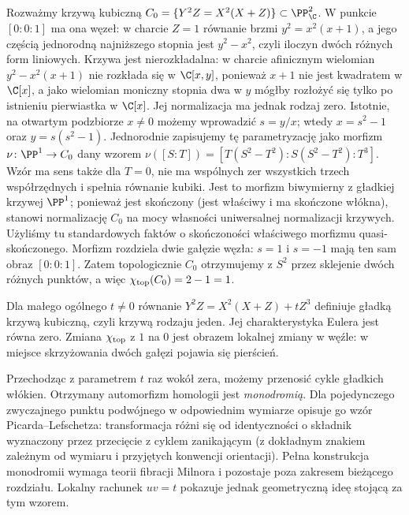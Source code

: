 \begin{przyklad}
Rozważmy krzywą kubiczną
$C_0=\{Y^2Z=X^2(X+Z)\}\subset\PP^2_\C$.
W punkcie $[0:0:1]$ ma ona węzeł: w charcie $Z=1$
równanie brzmi $y^2=x^2(x+1)$, a jego częścią
jednorodną najniższego stopnia jest $y^2-x^2$,
czyli iloczyn dwóch różnych form liniowych.
Krzywa jest nierozkładalna: w charcie afinicznym wielomian
$y^2-x^2(x+1)$ nie rozkłada się w $\C[x,y]$, ponieważ
$x+1$ nie jest kwadratem w $\C[x]$, a jako wielomian
moniczny stopnia dwa w $y$ mógłby rozłożyć się tylko
po istnieniu pierwiastka w $\C[x]$.
Jej normalizacja ma jednak rodzaj zero. Istotnie, na otwartym podzbiorze
$x\ne0$ możemy wprowadzić $s=y/x$; wtedy
$x=s^2-1$ oraz $y=s(s^2-1)$.
Jednorodnie zapisujemy tę parametryzację jako morfizm
$\nu\colon\PP^1\to C_0$ dany wzorem
$\nu([S:T])=[T(S^2-T^2):S(S^2-T^2):T^3]$.
Wzór ma sens także dla $T=0$, nie ma wspólnych zer wszystkich
trzech współrzędnych i spełnia równanie kubiki.
Jest to morfizm biwymierny z gładkiej krzywej $\PP^1$;
ponieważ jest skończony (jest właściwy i ma skończone włókna),
stanowi normalizację $C_0$ na mocy własności uniwersalnej
normalizacji krzywych. Użyliśmy tu standardowych faktów
o skończoności właściwego morfizmu quasi-skończonego.
Morfizm rozdziela dwie gałęzie węzła:
$s=1$ i $s=-1$ mają ten sam obraz $[0:0:1]$.
Zatem topologicznie $C_0$ otrzymujemy z $S^2$
przez sklejenie dwóch różnych punktów, a więc
$\chi_{\rm top}(C_0)=2-1=1$.

Dla małego ogólnego $t\ne0$ równanie
$Y^2Z=X^2(X+Z)+tZ^3$ definiuje gładką
krzywą kubiczną, czyli krzywą rodzaju jeden.
Jej charakterystyka Eulera jest równa zero.
Zmiana $\chi_{\rm top}$ z $1$ na $0$ jest
obrazem lokalnej zmiany w węźle: w miejsce
skrzyżowania dwóch gałęzi pojawia się pierścień.
\end{przyklad}

\begin{uwaga}
Przechodząc z parametrem $t$ raz wokół zera,
możemy przenosić cykle gładkich włókien.
Otrzymany automorfizm homologii jest \emph{monodromią}.
Dla pojedynczego zwyczajnego punktu podwójnego
w odpowiednim wymiarze opisuje go wzór Picarda--Lefschetza:
transformacja różni się od identyczności o składnik
wyznaczony przez przecięcie z cyklem zanikającym
(z dokładnym znakiem zależnym od wymiaru i przyjętych
konwencji orientacji). Pełna konstrukcja monodromii
wymaga teorii fibracji Milnora i pozostaje poza
zakresem bieżącego rozdziału. Lokalny rachunek $uv=t$
pokazuje jednak geometryczną ideę stojącą za tym wzorem.
\end{uwaga}

